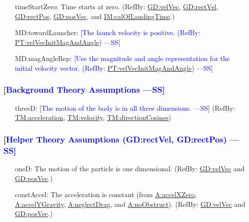 \documentclass[12pt]{article}
\newcommand{\authornote}[3]{\textcolor{#1}{[#3 ---#2]}}
\newcommand{\authornote}[3]{}
\newcommand{\wss}[1]{\authornote{blue}{SS}{#1}}
\begin{document}
\begin{itemize}
\item[timeStartZero:\phantomsection\label{timeStartZero}]{Time starts at zero. (RefBy: \hyperref[GD:velVec]{GD:velVec}, \hyperref[GD:rectVel]{GD:rectVel}, \hyperref[GD:rectPos]{GD:rectPos}, \hyperref[GD:posVec]{GD:posVec}, and \hyperref[IM:calOfLandingTime]{IM:calOfLandingTime}.)}
\item[MD:towardLauncher:\phantomsection\label{MD:towardLauncher}]\wss{The launch velocity is positive. (RefBy: \hyperref[PT:velVecInitMagAndAngle]{PT:velVecInitMagAndAngle})}
\item[MD:magAngleRep:\phantomsection\label{MD:magAngleRep}]\wss{Use the magnitude and angle representation for the initial velocity vector. (RefBy: \hyperref[PT:velVecInitMagAndAngle]{PT:velVecInitMagAndAngle})}

\end{itemize}

\subsubsection{\wss{Background Theory Assumptions}}

\begin{itemize}
\item[threeD:\phantomsection\label{threeD}]{\wss{The motion of the body is in
all three dimensions.} (RefBy: \hyperref[TM:acceleration] {TM:acceleration},
\hyperref[TM:velocity] {TM:velocity}, \hyperref[TM:directionCosines]
{TM:directionCosines})}
\end{itemize}

\subsubsection{\wss{Helper Theory Assumptions (GD:rectVel, GD:rectPos)}}

\begin{itemize}
\item[oneD:\phantomsection\label{oneD}]{The motion of the particle is one dimensional. (RefBy: \hyperref[GD:velVec]{GD:velVec} and \hyperref[GD:posVec]{GD:posVec}.)}
\item[constAccel:\phantomsection\label{constAccel}]{The acceleration is constant (from \hyperref[accelXZero]{A:accelXZero}, \hyperref[accelYGravity]{A:accelYGravity}, \hyperref[neglectDrag]{A:neglectDrag}, and \hyperref[noObstruct]{A:noObstruct}). (RefBy: \hyperref[GD:velVec]{GD:velVec} and \hyperref[GD:posVec]{GD:posVec}.)}
\end{itemize}
\end{document}
